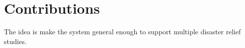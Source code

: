  
\section{Contributions}

The idea is make the system general enough to support multiple disaster relief studies.
